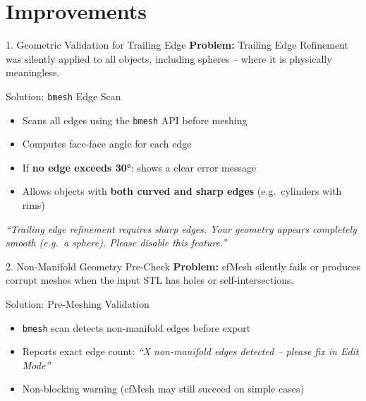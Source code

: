\documentclass[dvipsnames,mathserif]{beamer}
\begin{document}
\section{Improvements}
\begin{frame}{1. Geometric Validation for Trailing Edge}
    \textbf{Problem:} Trailing Edge Refinement was silently applied to all objects, including spheres -- where it is physically meaningless.
    \vspace{0.2cm}
    \begin{block}{Solution: \texttt{bmesh} Edge Scan}
        \begin{itemize}
            \item Scans all edges using the \texttt{bmesh} API before meshing
            \item Computes face-face angle for each edge
            \item If \textbf{no edge exceeds 30°}: shows a clear error message
            \item Allows objects with \textbf{both curved and sharp edges} (e.g.\ cylinders with rims)
        \end{itemize}
    \end{block}
    \vspace{0.1cm}
    \textit{``Trailing edge refinement requires sharp edges. Your geometry appears completely smooth (e.g.\ a sphere). Please disable this feature.''}
\end{frame}

\begin{frame}{2. Non-Manifold Geometry Pre-Check}
    \textbf{Problem:} cfMesh silently fails or produces corrupt meshes when the input STL has holes or self-intersections.
    \vspace{0.3cm}
    \begin{block}{Solution: Pre-Meshing Validation}
        \begin{itemize}
            \item \texttt{bmesh} scan detects non-manifold edges before export
            \item Reports exact edge count: \textit{``X non-manifold edges detected -- please fix in Edit Mode''}
            \item Non-blocking warning (cfMesh may still succeed on simple cases)
        \end{itemize}
    \end{block}
\end{frame}
\end{document}
